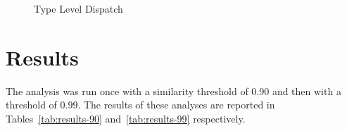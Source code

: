\begin{figure}[p!]
	\centering
	\begin{minipage}{0.49\textwidth}
		\centering
		\begin{minipage}{\linewidth}
			\centering
			\captionsetup{type=listing,skip=2pt}
			\caption{Standalone Functions}
			\label{fig:standalone-functions}
		\end{minipage}
		\vspace{1em}
		\begin{minipage}{\linewidth}
			\centering
			\captionsetup{type=listing,skip=2pt}
			\caption{Inherent Impls}
			\label{fig:inherent-impls}
		\end{minipage}
		\vspace{1em}
		\begin{minipage}{\linewidth}
			\centering
			\captionsetup{type=listing,skip=2pt}
			\caption{Manual Dispatch}
			\label{fig:manual-dispatch}
		\end{minipage}
	\end{minipage}
	\hfill
	\begin{minipage}{0.49\textwidth}
		\centering
		\begin{minipage}{\linewidth}
			\centering
			\captionsetup{type=listing,skip=2pt}
			\caption{Monomorphized Traits}
			\label{fig:monomorphized-traits}
		\end{minipage}
		\vspace{1em}
		\begin{minipage}{\linewidth}
			\centering
			\captionsetup{type=listing,skip=2pt}
			\caption{Type Level Dispatch}
			\label{fig:type-level-dispatch}
		\end{minipage}
	\end{minipage}
\end{figure}


\section{Results}\label{experimentation-results}
The analysis was run once with a similarity threshold of 0.90 and then with a threshold of 0.99.
The results of these analyses are reported in Tables~\ref{tab:results-90} and~\ref{tab:results-99} respectively.

